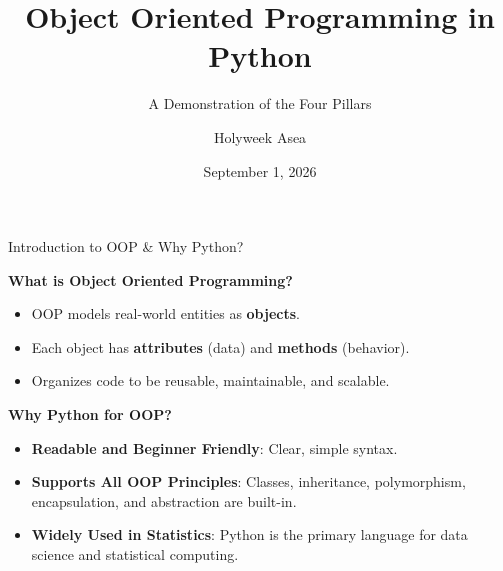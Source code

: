 \documentclass{beamer}
\title{Object Oriented Programming in Python}
\subtitle{A Demonstration of the Four Pillars}
\author{Holyweek Asea}
\institute{Student Number: 2500721983 \\[0.1cm] Makerere University}
\date{September 1, 2026}
\begin{document}
	
	\begin{frame}
		\titlepage
	\end{frame}
	
	\begin{frame}{Introduction to OOP \& Why Python?}
		
		\textbf{What is Object Oriented Programming?}
		\begin{itemize}
			\item OOP models real-world entities as \textbf{objects}.
			\item Each object has \textbf{attributes} (data) and \textbf{methods} (behavior).
			\item Organizes code to be reusable, maintainable, and scalable.
		\end{itemize}
		
		\vspace{0.1cm}
		
		\textbf{Why Python for OOP?}
		\begin{itemize}
			\item \textbf{Readable and Beginner Friendly}: Clear, simple syntax.
			\item \textbf{Supports All OOP Principles}: Classes, inheritance, polymorphism, encapsulation, and abstraction are built-in.
			\item \textbf{Widely Used in Statistics}: Python is the primary language for data science and statistical computing.
		\end{itemize}
		
	\end{frame}
	
\end{document}
